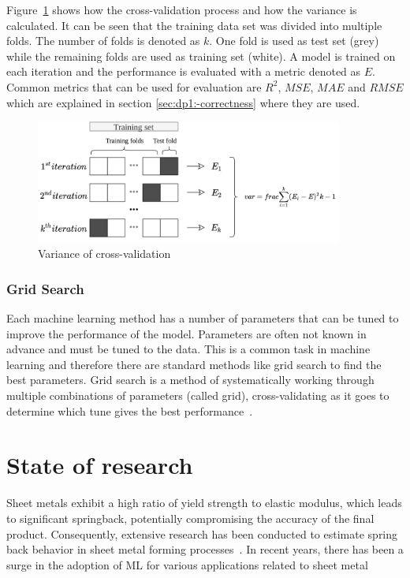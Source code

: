 Figure~\ref{fig:cross-validation} shows how the cross-validation process and how the variance
is calculated.
It can be seen that the training data set was divided into multiple folds.
The number of folds is denoted as $k$.
One fold is used as test set (grey) while the remaining folds are used as training set (white).
A model is trained on each iteration and the performance is evaluated with a metric denoted as $E$.
Common metrics that can be used for evaluation are $R^2$, $MSE$, $MAE$ and $RMSE$ which are explained in section
\ref{sec:dp1:-correctness} where they are used.

\begin{figure}[h]
    \begin{tcolorbox}[arc=0pt,boxrule=0.5pt]
        \centering
        \includegraphics[trim=left botm right top, width=0.9\textwidth]
        {chap2/images/cross_validation}
        \caption{Variance of cross-validation}
        \label{fig:cross-validation}
    \end{tcolorbox}
\end{figure}

\subsubsection{Grid Search}\label{subsubsec:grid-search}
Each machine learning method has a number of parameters that can be tuned to improve the
performance of the model.
Parameters are often not known in advance and must be tuned to the data.
This is a common task in machine learning and therefore there are standard methods like
grid search to find the best parameters.
Grid search is a method of systematically working through multiple combinations of
parameters (called grid), cross-validating as it goes to determine which tune gives the best
performance~\cite[p. 260--275]{muller_introductionmachinelearning_2016}.


\section{State of research}\label{sec:state-of-research}
Sheet metals exhibit a high ratio of yield strength to elastic modulus, which leads to significant springback,
potentially compromising the accuracy of the final product. Consequently, extensive research has been conducted to
estimate spring back behavior in sheet metal forming processes~\cite[p. 565]{liu2021deep}.
In recent years, there has been a surge in the adoption of \ac{ML} for various applications related to sheet metal

